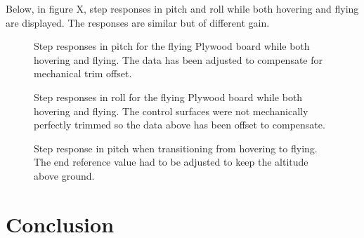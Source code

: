 \documentclass{article}
\begin{document}
Below, in figure X, step responses in pitch and roll while both hovering and flying are displayed.
The responses are similar but of different gain.


\begin{figure}[]
    \centering
    
    \caption{Step responses in pitch for the flying Plywood board while both hovering and flying. The data has been adjusted to compensate for mechanical trim offset.}
    \label{airplane}
\end{figure}

\begin{figure}[]
    
    \caption{Step responses in roll for the flying Plywood board while both hovering and flying. The control surfaces were not mechanically perfectly trimmed so the data above has been offset to compensate.}
    \label{airplane}
\end{figure}

\begin{figure}[]
    
    \caption{Step response in pitch when transitioning from hovering to flying. The end reference value had to be adjusted to keep the altitude above ground.}
    \label{airplane}
\end{figure}



\section{Conclusion}

\newpage
\end{document}
